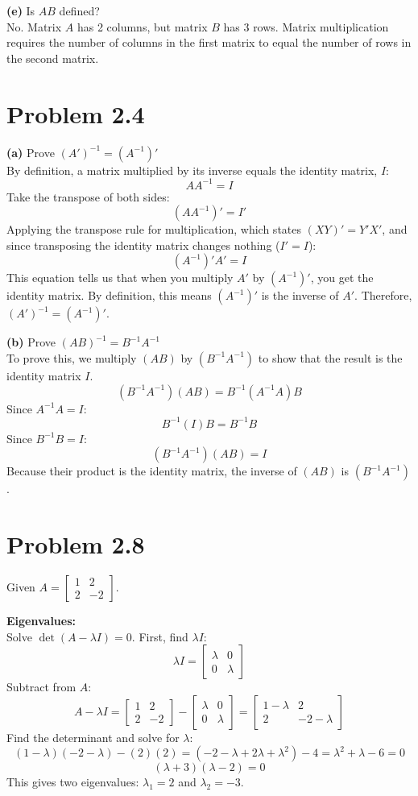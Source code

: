 \documentclass{article}
\begin{document}
\noindent \textbf{(e)} Is $AB$ defined? \\
No. Matrix $A$ has 2 columns, but matrix $B$ has 3 rows. Matrix multiplication requires the number of columns in the first matrix to equal the number of rows in the second matrix.


\section*{Problem 2.4}
\noindent \textbf{(a)} Prove $(A')^{-1} = (A^{-1})'$ \\
By definition, a matrix multiplied by its inverse equals the identity matrix, $I$: 
\[
AA^{-1} = I
\]
Take the transpose of both sides:
\[
(AA^{-1})' = I'
\]
Applying the transpose rule for multiplication, which states $(XY)' = Y'X'$, and since transposing the identity matrix changes nothing ($I' = I$):
\[
(A^{-1})'A' = I
\]
This equation tells us that when you multiply $A'$ by $(A^{-1})'$, you get the identity matrix. By definition, this means $(A^{-1})'$ is the inverse of $A'$. Therefore, $(A')^{-1} = (A^{-1})'$.

\vspace{1em}
\noindent \textbf{(b)} Prove $(AB)^{-1} = B^{-1}A^{-1}$ \\
To prove this, we multiply $(AB)$ by $(B^{-1}A^{-1})$ to show that the result is the identity matrix $I$.
\[
(B^{-1}A^{-1})(AB) = B^{-1}(A^{-1}A)B 
\]
Since $A^{-1}A = I$:
\[
B^{-1}(I)B = B^{-1}B 
\]
Since $B^{-1}B = I$:
\[
(B^{-1}A^{-1})(AB) = I
\]
Because their product is the identity matrix, the inverse of $(AB)$ is $(B^{-1}A^{-1})$.

\hrulefill

\section*{Problem 2.8}
Given $A = \begin{bmatrix} 1 & 2 \\ 2 & -2 \end{bmatrix}$.

\noindent \textbf{Eigenvalues:} \\
Solve $\det(A - \lambda I) = 0$. First, find $\lambda I$:
\[
\lambda I = \begin{bmatrix} \lambda & 0 \\ 0 & \lambda \end{bmatrix}
\]
Subtract from $A$:
\[
A - \lambda I = \begin{bmatrix} 1 & 2 \\ 2 & -2 \end{bmatrix} - \begin{bmatrix} \lambda & 0 \\ 0 & \lambda \end{bmatrix} = \begin{bmatrix} 1-\lambda & 2 \\ 2 & -2-\lambda \end{bmatrix}
\]
Find the determinant and solve for $\lambda$:
\[
(1-\lambda)(-2-\lambda) - (2)(2) = (-2 - \lambda + 2\lambda + \lambda^2) - 4 = \lambda^2 + \lambda - 6 = 0
\]
\[
(\lambda + 3)(\lambda - 2) = 0 
\]
This gives two eigenvalues: $\lambda_1 = 2$ and $\lambda_2 = -3$.
\end{document}
